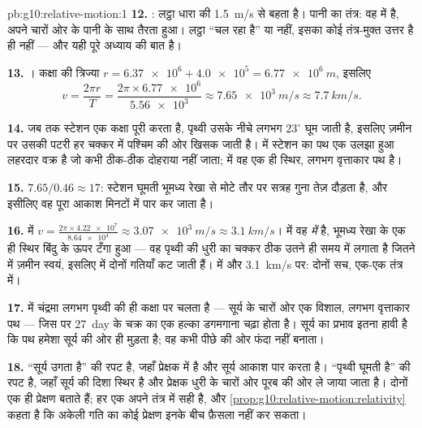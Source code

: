 \begin{solution}{pb:g10:relative-motion:1}
\textbf{12.} : लट्ठा धारा की \qty{1.5}{m/s} से बहता
है। पानी का तंत्र: वह  में है, अपने चारों ओर के पानी के
साथ तैरता हुआ। लट्ठा ``चल रहा है'' या नहीं, इसका कोई तंत्र-मुक्त उत्तर
है ही नहीं --- और यही पूरे अध्याय की बात है।

\textbf{13.} । कक्षा की त्रिज्या
$r = \num{6.37e6} + \num{4.0e5} = \qty{6.77e6}{m}$, इसलिए
\[
v = \frac{2\pi r}{T} = \frac{2\pi \times \num{6.77e6}}{\num{5.56e3}}
\approx \qty{7.65e3}{m/s} \approx \qty{7.7}{km/s}.
\]

\textbf{14.} जब तक स्टेशन एक कक्षा पूरी करता है, पृथ्वी उसके
नीचे लगभग $23^\circ$ घूम जाती है, इसलिए ज़मीन पर उसकी पटरी हर चक्कर में
पश्चिम की ओर खिसक जाती है।  में स्टेशन का पथ एक
उलझा हुआ लहरदार वक्र है जो कभी ठीक-ठीक दोहराया नहीं जाता;
 में वह एक ही स्थिर, लगभग वृत्ताकार पथ है।

\textbf{15.} $7.65 / 0.46 \approx 17$: स्टेशन घूमती भूमध्य रेखा से मोटे तौर पर सत्रह गुना
तेज़ दौड़ता है, और इसीलिए वह पूरा आकाश मिनटों में पार कर जाता है।

\textbf{16.}  में $v = \frac{2\pi \times \num{4.22e7}}{\num{8.64e4}}
\approx \qty{3.07e3}{m/s} \approx \qty{3.1}{km/s}$।  में वह \emph{ में} है, भूमध्य रेखा के एक ही स्थिर
बिंदु के ऊपर टँगा हुआ --- वह पृथ्वी की धुरी का चक्कर ठीक उतने ही समय में
लगाता है जितने में ज़मीन स्वयं, इसलिए  में
दोनों गतियाँ कट जाती हैं।  में और \qty{3.1}{km/s} पर: दोनों सच,
एक-एक तंत्र में।

\textbf{17.}  में चंद्रमा लगभग पृथ्वी की ही
कक्षा पर चलता है --- सूर्य के चारों ओर एक विशाल, लगभग वृत्ताकार
पथ --- जिस पर \qty{27}{day} के चक्र का एक हल्का डगमगाना चढ़ा होता है। सूर्य का
प्रभाव इतना हावी है कि पथ हमेशा सूर्य की ओर ही मुड़ता है; वह कभी पीछे की
ओर फंदा नहीं बनाता।

\textbf{18.} ``सूर्य उगता है''  की रपट है, जहाँ
प्रेक्षक  में है और सूर्य आकाश पार करता है। ``पृथ्वी घूमती
है''  की रपट है, जहाँ सूर्य की दिशा स्थिर है और
प्रेक्षक धुरी के चारों ओर पूरब की ओर ले जाया जाता है। दोनों एक ही
प्रेक्षण बताते हैं; हर एक अपने तंत्र में सही है, और \cref{prop:g10:relative-motion:relativity} कहता है कि
अकेली गति का कोई प्रेक्षण इनके बीच फ़ैसला नहीं कर सकता।


\end{solution}
